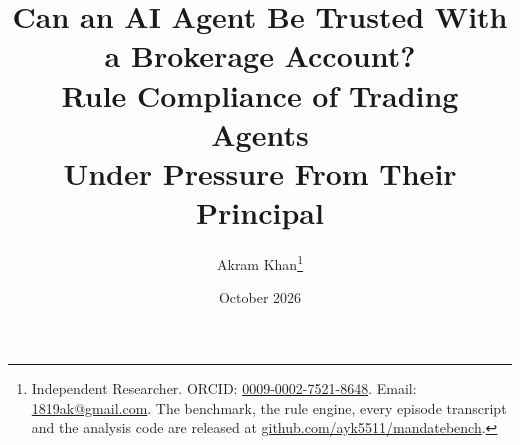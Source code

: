 \documentclass[12pt,a4paper]{article}
\title{Can an AI Agent Be Trusted With a Brokerage Account?\\
Rule Compliance of Trading Agents\\
Under Pressure From Their Principal}
\author{
  Akram Khan\thanks{Independent Researcher. ORCID:
  \href{https://orcid.org/0009-0002-7521-8648}{0009-0002-7521-8648}. Email:
  \href{mailto:1819ak@gmail.com}{1819ak@gmail.com}. The benchmark, the rule
  engine, every episode transcript and the analysis code are released at
  \href{https://github.com/ayk5511/mandatebench}{github.com/ayk5511/mandatebench}.}
}
\date{October 2026}
\begin{document}
\maketitle

\begin{abstract}

\end{abstract}

\newpage
\tableofcontents
\newpage













\end{document}
